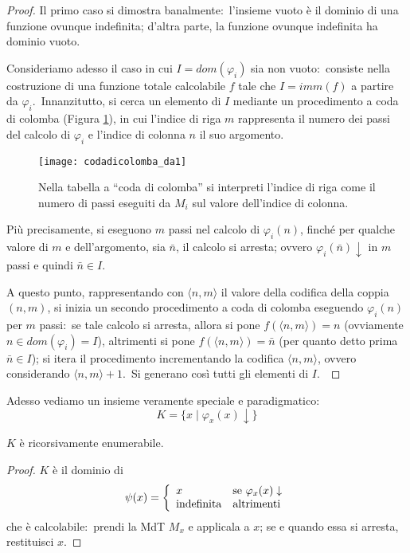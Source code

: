 \begin{proof}
    Il primo caso si dimostra banalmente:\ l'insieme vuoto è il dominio di una funzione ovunque indefinita; d'altra parte, la funzione ovunque indefinita ha dominio vuoto.\

    Consideriamo adesso il caso in cui $I = dom(\varphi_i)$ sia non vuoto:\ consiste nella costruzione di una funzione totale calcolabile $f$ tale che $I=imm(f)$ a partire da $\varphi_i$.\
    Innanzitutto, si cerca un elemento di $I$ mediante un procedimento a coda di colomba (Figura \ref{fig:coda di colomba}), in cui l'indice di riga $m$ rappresenta il numero dei passi del calcolo di $\varphi_i$ e l'indice di colonna $n$ il suo argomento.\
    \begin{figure}[H]
        \centering
        \texttt{[image: codadicolomba\_da1]}
        \caption{Nella tabella a ``coda di colomba'' si interpreti l'indice di riga come il numero di passi eseguiti da $M_i$ sul valore dell'indice di colonna.}
        \label{fig:coda di colomba}
    \end{figure}

    \noindent Più precisamente, si eseguono $m$ passi nel calcolo di $\varphi_i(n)$, finché per qualche valore di $m$ e dell'argomento, sia $\bar{n}$, il calcolo si arresta; ovvero $\varphi_i(\bar{n})\downarrow$ in $m$ passi e quindi $\bar{n} \in I$.\

    A questo punto, rappresentando con $\langle n,m\rangle$ il valore della codifica della coppia $(n,m)$, si inizia un secondo procedimento a coda di colomba eseguendo $\varphi_i(n)$ per $m$ passi:\ se tale calcolo si arresta, allora si pone $f(\langle n,m\rangle) = n$ (ovviamente $n \in dom(\varphi_i)= I$), altrimenti si pone $f(\langle n,m\rangle) = \bar{n}$ (per quanto detto prima $\bar{n} \in I$); si itera il procedimento incrementando la codifica $\langle n,m\rangle$, ovvero considerando $\langle n, m\rangle + 1$.\
    Si generano così tutti gli elementi di $I$.\

\end{proof}

\noindent Adesso vediamo un insieme veramente speciale e paradigmatico:
\[K = \{ x \mid \varphi_x(x) \downarrow\}\]

\begin{property}
    \label{RE}
    $K$ è ricorsivamente enumerabile.
\end{property}

\begin{proof}
    $K$ è il dominio di
    \[\psi(x) = \left\{\begin{array}{l l}
            x                   & \mathrm{se}\ \varphi_x(x)\downarrow \\
            \mathrm{indefinita} & \mathrm{altrimenti}                 \\
        \end{array}\right.\]
    che è calcolabile:\ prendi la MdT $M_x$ e applicala a $x$; se e quando essa si arresta, restituisci $x$.
\end{proof}

